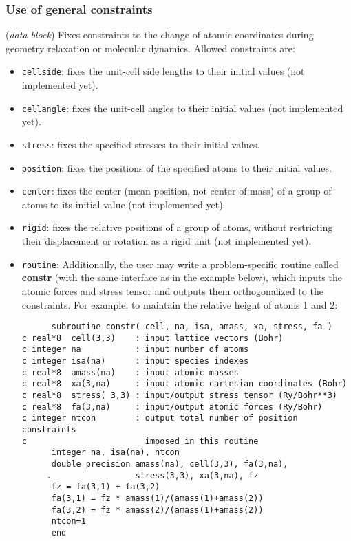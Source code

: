\documentclass[11pt]{article}
\begin{document}
\subsubsection{Use of general constraints}
\begin{description}
\itemsep 10pt
\parsep 0pt

\item[{\bf GeometryConstraints}] ({\it data block}) 
Fixes constraints to the change of atomic coordinates during
geometry relaxation or molecular dynamics. Allowed constraints are:
\begin{itemize}
\item {\tt cellside}: fixes the unit-cell side lengths to
their initial values (not implemented yet).
\item {\tt cellangle}: fixes the unit-cell angles to
their initial values (not implemented yet).
\item {\tt stress}: fixes the specified stresses to
their initial values.
\item {\tt position}: fixes the positions of the specified atoms to
their initial values.
\item {\tt center}: fixes the center (mean position, not center of
mass) of a group of atoms to its initial value (not implemented yet).
\item {\tt rigid}: fixes the relative positions of a group of atoms,
without restricting their displacement or rotation as a rigid unit
(not implemented yet).
\item {\tt routine}: Additionally, the user may write a 
problem-specific routine called {\bf constr} (with the same 
interface as in the example below), which inputs the atomic
forces and stress tensor and outputs them orthogonalized to the
constraints. For example, to maintain the relative height of 
atoms 1 and 2:

\begin{verbatim}
      subroutine constr( cell, na, isa, amass, xa, stress, fa )
c real*8  cell(3,3)    : input lattice vectors (Bohr)
c integer na           : input number of atoms
c integer isa(na)      : input species indexes
c real*8  amass(na)    : input atomic masses
c real*8  xa(3,na)     : input atomic cartesian coordinates (Bohr)
c real*8  stress( 3,3) : input/output stress tensor (Ry/Bohr**3)
c real*8  fa(3,na)     : input/output atomic forces (Ry/Bohr)
c integer ntcon        : output total number of position constraints
c                        imposed in this routine
      integer na, isa(na), ntcon
      double precision amass(na), cell(3,3), fa(3,na),
     .                 stress(3,3), xa(3,na), fz
      fz = fa(3,1) + fa(3,2) 
      fa(3,1) = fz * amass(1)/(amass(1)+amass(2))
      fa(3,2) = fz * amass(2)/(amass(1)+amass(2))
      ntcon=1
      end
\end{verbatim}


\end{itemize}
\end{description}
\end{document}
